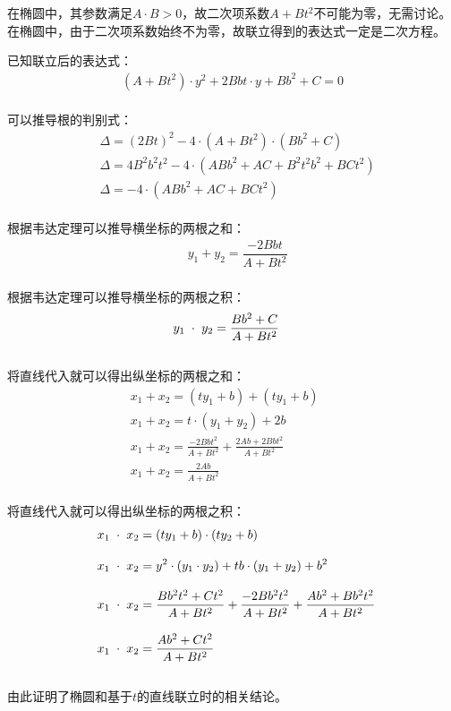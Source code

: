 \documentclass[UTF8]{ctexart}
\begin{document}
    在椭圆中，其参数满足$A\cdot B>0$，故二次项系数$A+Bt^2$不可能为零，无需讨论。\\[3mm]
    在椭圆中，由于二次项系数始终不为零，故联立得到的表达式一定是二次方程。
    
\newpage

    已知联立后的表达式：
    \begin{align}
        \left(A+Bt^2\right)\cdot y^2+2Bbt\cdot y+Bb^2+C=0
    \end{align}\\
    可以推导根的判别式：
    \begin{align}
        &\Delta=(2Bt)^2-4\cdot\left(A+Bt^2\right)\cdot\left(Bb^2+C\right)\\[3mm]
        &\Delta=4B^2b^2t^2-4\cdot\left(ABb^2+AC+B^2t^2b^2+BCt^2\right)\\[3mm]
        &\Delta=-4\cdot\left(ABb^2+AC+BCt^2\right)
    \end{align}\\
    根据韦达定理可以推导横坐标的两根之和：
    \begin{align}
        &y_1+y_2=\dfrac{-2Bbt}{A+Bt^2}
    \end{align}\\
    根据韦达定理可以推导横坐标的两根之积：
    \begin{align}
        &y_1\hspace{3.0pt}\cdot\hspace{3.0pt}y_2=\dfrac{Bb^2+C}{A+Bt^2}
    \end{align}\\    
    将直线代入就可以得出纵坐标的两根之和：\vspace{3pt}
    \begin{align}
        &x_1+x_2=(ty_1+b)+(ty_1+b)\\[3mm]
        &x_1+x_2=t\cdot(y_1+y_2)+2b\\[3mm]
        &x_1+x_2=\frac{-2Bbt^2}{A+Bt^2}+\frac{2Ab+2Bbt^2}{A+Bt^2}~~~~~~~~~~~~~~~~~~~~~~\\[3mm]
        &x_1+x_2=\frac{2Ab}{A+Bt^2}
    \end{align}\\
    将直线代入就可以得出纵坐标的两根之积：\vspace{3pt}
    \begin{align}
        &~~x_1\hspace{3.0pt}\cdot\hspace{3.0pt}x_2=(ty_1+b)\cdot(ty_2+b)\\[3mm]
        &~~x_1\hspace{3.0pt}\cdot\hspace{3.0pt}x_2=y^2\cdot(y_1\cdot y_2)+tb\cdot(y_1+y_2)+b^2\\[3mm]
        &~~x_1\hspace{3.0pt}\cdot\hspace{3.0pt}x_2=\frac{Bb^2t^2+Ct^2}{A+Bt^2}+\frac{-2Bb^2t^2}{A+Bt^2}+\frac{Ab^2+Bb^2t^2}{A+Bt^2}\\[3mm]
        &~~x_1\hspace{3.0pt}\cdot\hspace{3.0pt}x_2=\frac{Ab^2+Ct^2}{A+Bt^2}
    \end{align}\\
    由此证明了椭圆和基于$t$的直线联立时的相关结论。
\end{document}
